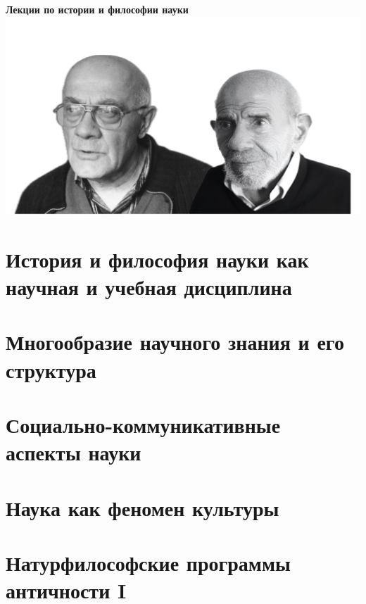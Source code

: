 \documentclass[a4paper, 12pt, notitlepage]{report}
\begin{document}
\begin{titlepage}
    \centering
    \vspace*{9cm}
    {\Huge \textbf{Лекции по истории и философии науки}}
    \includegraphics[width=\textwidth,trim=4 4 4 4,clip]{pictures/title.png}
    \vfill
\end{titlepage}

\tableofcontents

\chapter{История и философия науки как научная и учебная дисциплина}


\chapter{Многообразие научного знания и его структура}


\chapter{Социально-коммуникативные аспекты науки}


\chapter{Наука как феномен культуры}


\chapter{Натурфилософские программы античности I}

\end{document}
